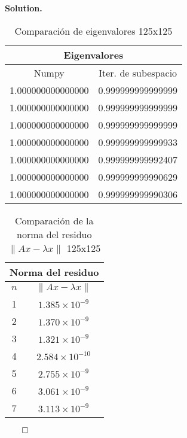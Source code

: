\documentclass{article}
\theoremstyle{problemstyle}
\newenvironment{solution}{%
  \begin{mdframed}[linewidth=0.8pt,linecolor=Gray,backgroundcolor=Gray!5,roundcorner=5pt]%
  \noindent\textbf{Solution.}%
}{%
\hfill $ \qed $ 
  \end{mdframed}%
}
\begin{document}
\begin{solution}
	\begin{table}[H]
		\begin{center}
			\begin{tabular}{|c|c|}
				\multicolumn{2}{c}{Eigenvalores}        \\
				\hline
				Numpy             & Iter. de subespacio \\
				\hline

				1.000000000000000 & 0.999999999999999   \\
				\hline
				1.000000000000000 & 0.999999999999999   \\
				\hline
				1.000000000000000 & 0.999999999999999   \\
				\hline
				1.000000000000000 & 0.999999999999933   \\
				\hline
				1.000000000000000 & 0.999999999992407   \\
				\hline
				1.000000000000000 & 0.999999999990629   \\
				\hline
				1.000000000000000 & 0.999999999990306   \\
				\hline
			\end{tabular}
		\end{center}
		\caption{Comparaci\'on de eigenvalores 125x125}\label{tab:evals_comparison_ones}
	\end{table}

	\begin{table}[H]
		\begin{center}
			\begin{tabular}{|c|c|}
				\multicolumn{2}{c}{Norma del residuo} \\
				\hline
				$n$ & $\lVert Ax - \lambda x \rVert$  \\
				\hline
				1   & $1.385 \times 10^{-9}$          \\
				\hline
				2   & $1.370 \times 10^{-9}$          \\
				\hline
				3   & $1.321 \times 10^{-9}$          \\
				\hline
				4   & $2.584 \times 10^{-10}$         \\
				\hline
				5   & $2.755 \times 10^{-9}$          \\
				\hline
				6   & $3.061 \times 10^{-9}$          \\
				\hline
				7   & $3.113 \times 10^{-9}$          \\
				\hline
			\end{tabular}
		\end{center}
		\caption{Comparaci\'on de la norma del residuo $\lVert Ax - \lambda x \rVert$ 125x125}\label{tab:residual_norms_small2}
	\end{table}
\end{solution}
\end{document}
